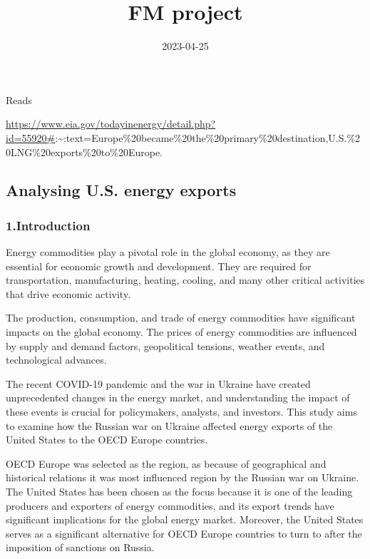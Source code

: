 \documentclass[
]{article}
\title{FM project}
\author{}
\date{\vspace{-2.5em}2023-04-25}
\begin{document}
\maketitle

Reads

\url{https://www.eia.gov/todayinenergy/detail.php?id=55920\#}:\textasciitilde:text=Europe\%20became\%20the\%20primary\%20destination,U.S.\%20LNG\%20exports\%20to\%20Europe.

\hypertarget{analysing-u.s.-energy-exports}{%
\subsection{Analysing U.S. energy
exports}\label{analysing-u.s.-energy-exports}}

\hypertarget{introduction}{%
\subsubsection{1.Introduction}\label{introduction}}

Energy commodities play a pivotal role in the global economy, as they
are essential for economic growth and development. They are required for
transportation, manufacturing, heating, cooling, and many other critical
activities that drive economic activity.

The production, consumption, and trade of energy commodities have
significant impacts on the global economy. The prices of energy
commodities are influenced by supply and demand factors, geopolitical
tensions, weather events, and technological advances.

The recent COVID-19 pandemic and the war in Ukraine have created
unprecedented changes in the energy market, and understanding the impact
of these events is crucial for policymakers, analysts, and investors.
This study aims to examine how the Russian war on Ukraine affected
energy exports of the United States to the OECD Europe countries.

OECD Europe was selected as the region, as because of geographical and
historical relations it was most influenced region by the Russian war on
Ukraine. The United States has been chosen as the focus because it is
one of the leading producers and exporters of energy commodities, and
its export trends have significant implications for the global energy
market. Moreover, the United States serves as a significant alternative
for OECD Europe countries to turn to after the imposition of sanctions
on Russia.
\end{document}
